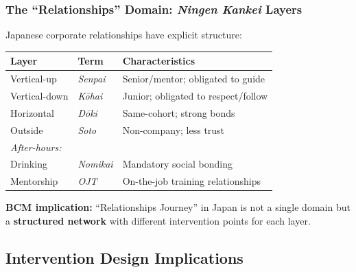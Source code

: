 \subsubsection{The ``Relationships'' Domain: \textit{Ningen Kankei} Layers}

Japanese corporate relationships have explicit structure:

\begin{center}
\begin{tabular}{@{}llp{5cm}@{}}
\toprule
\textbf{Layer} & \textbf{Term} & \textbf{Characteristics} \\
\midrule
Vertical-up & \textit{Senpai} & Senior/mentor; obligated to guide \\
Vertical-down & \textit{Kōhai} & Junior; obligated to respect/follow \\
Horizontal & \textit{Dōki} & Same-cohort; strong bonds \\
Outside & \textit{Soto} & Non-company; less trust \\
\midrule
\multicolumn{3}{l}{\textit{After-hours:}} \\
Drinking & \textit{Nomikai} & Mandatory social bonding \\
Mentorship & \textit{OJT} & On-the-job training relationships \\
\bottomrule
\end{tabular}
\end{center}

\textbf{BCM implication:} ``Relationships Journey'' in Japan is not a single domain but a \textbf{structured network} with different intervention points for each layer.

\subsection{Intervention Design Implications}

